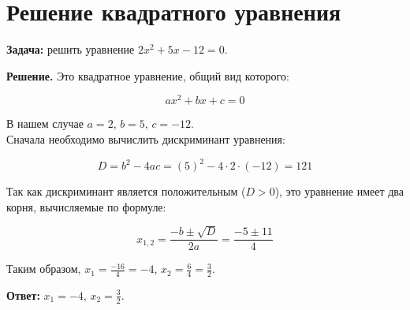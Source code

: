 \documentclass[a4paper,12pt]{article}
\begin{document}
\section{Решение квадратного уравнения}

\textbf{Задача:} решить уравнение $2x^2 + 5x - 12 = 0$.

\textbf{Решение.} Это квадратное уравнение, общий вид которого:

$$ ax^2 + bx + c = 0 $$

В нашем случае $a = 2$, $b = 5$, $c = -12$.\\
Сначала необходимо вычислить дискриминант уравнения:

$$ D = b^2 - 4ac = (5)^2 - 4 \cdot 2 \cdot (-12) = 121 $$

Так как дискриминант является положительным ($D > 0$), это уравнение имеет два корня, вычисляемые по формуле:

$$ x_{1,2} = \frac{-b \pm \sqrt{D}}{2a} = \frac{-5 \pm 11}{4} $$

Таким образом, $x_1 = \frac{-16}{4} = -4$, $x_2 = \frac{6}{4} = \frac{3}{2}$.

\textbf{Ответ:} $x_1 = -4$, $x_2 = \frac{3}{2}$.
\end{document}

